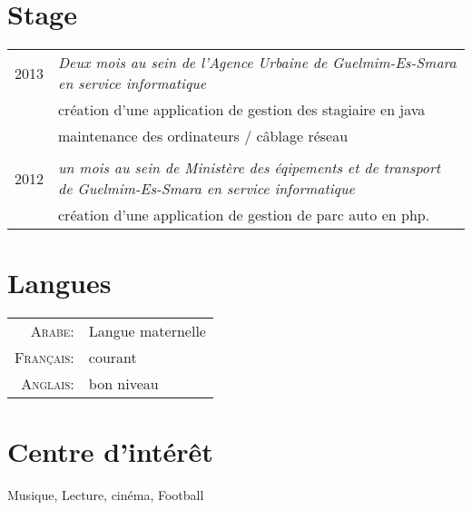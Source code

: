 \documentclass[a4paper,10pt]{article} %
\begin{document}

\section{Stage}

\begin{tabular}{r|p{11cm}}

\textsc{ 2013} & \emph{Deux mois au sein de l'Agence Urbaine de Guelmim-Es-Smara en service informatique}\\ 
& \footnotesize{création d'une application de gestion des stagiaire en java} \\
& \footnotesize{maintenance des ordinateurs / câblage réseau} \\
\multicolumn{2}{c}{} \\


\textsc{ 2012} & \emph{un mois au sein de Ministère des éqipements et de transport de Guelmim-Es-Smara en service informatique}\\ 
& \footnotesize{création d'une application de gestion de parc auto en php}.

\end{tabular}


\section{Langues}

\begin{tabular}{rl}
\textsc{Arabe:} & Langue maternelle\\

\textsc{Français:} & courant \\

\textsc{Anglais:} & bon niveau \\
\end{tabular}


\section{Centre d'intérêt }

Musique, Lecture, cinéma, Football \\
\end{document}
